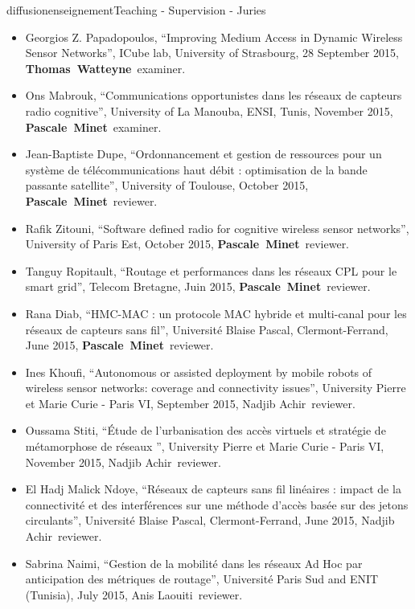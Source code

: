 \documentclass{ra2016}
\newcommand{\pascale} {\textbf{Pascale~Minet}}
\newcommand{\thomas}  {\textbf{Thomas~Watteyne}}
\begin{document}
\begin{module}{diffusion}{enseignement}{Teaching - Supervision - Juries}
\begin{itemize}
\begin{itemize}
            \item Georgios Z. Papadopoulos, ``Improving Medium Access in Dynamic Wireless Sensor Networks'', ICube lab, University of Strasbourg, 28 September 2015, \thomas~examiner.
            \item Ons Mabrouk, ``Communications opportunistes dans les r\'eseaux de capteurs radio cognitive'', University of La Manouba, ENSI, Tunis, November 2015, \pascale~examiner.
            \item Jean-Baptiste Dupe, ``Ordonnancement et gestion de ressources pour un syst\`eme de t\'el\'ecommunications haut d\'ebit : optimisation de la bande passante satellite'', University of Toulouse, October 2015, \pascale~reviewer.
            \item Rafik Zitouni, ``Software defined radio for cognitive wireless sensor networks'', University of Paris Est, October 2015, \pascale~reviewer.
            \item Tanguy Ropitault, ``Routage et performances dans les r\'eseaux CPL pour le smart grid'', Telecom Bretagne, Juin 2015, \pascale~reviewer.
            \item Rana Diab, ``HMC-MAC : un protocole MAC hybride et multi-canal pour les r\'eseaux de capteurs sans fil'', Universit\'e Blaise Pascal,  Clermont-Ferrand, June 2015, \pascale~reviewer.      
            \item  Ines Khoufi, ``Autonomous or assisted deployment by mobile robots of wireless sensor networks: coverage and connectivity issues'', University Pierre et Marie Curie - Paris VI, September 2015, Nadjib Achir~reviewer. 
            \item  Oussama Stiti, ``Étude de l'urbanisation des accès virtuels et stratégie de métamorphose de réseaux '', University Pierre et Marie Curie - Paris VI, November 2015, Nadjib Achir~reviewer. 
            \item  El Hadj Malick Ndoye, ``Réseaux de capteurs sans fil linéaires : impact de la connectivité et des interférences sur une méthode d'accès basée sur des jetons circulants'', Universit\'e Blaise Pascal,  Clermont-Ferrand, June 2015, Nadjib Achir~reviewer.
            \item  Sabrina Naimi, ``Gestion de la mobilité dans les réseaux Ad Hoc par anticipation des métriques de routage'', Université Paris Sud and ENIT (Tunisia), July 2015, Anis Laouiti~reviewer.
        \end{itemize}
\end{itemize}



\end{module}
\end{document}
